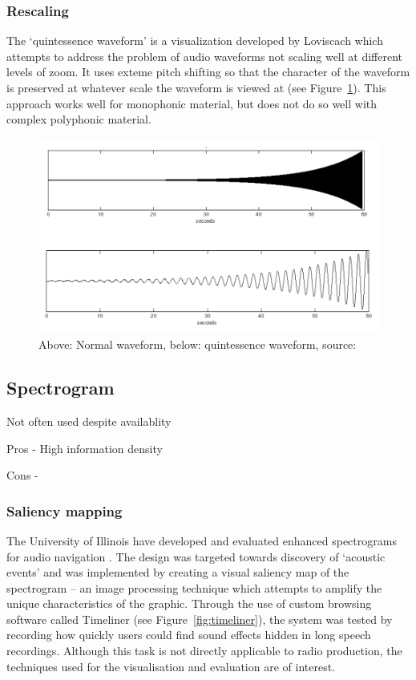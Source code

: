 \subsubsection{Rescaling}
The `quintessence waveform' is a visualization developed by Loviscach
\citep{Loviscach2011} which attempts to address the problem of audio waveforms
not scaling well at different levels of zoom. It uses exteme pitch shifting so
that the character of the waveform is preserved at whatever scale the waveform
is viewed at (see Figure~\ref{fig:quint}). This approach works well for
monophonic material, but does not do so well with complex polyphonic material.

\begin{figure}[ht]
  \centering
  \includegraphics[width=0.95\linewidth]{figs/quint.png}
  \caption{Above: Normal waveform, below: quintessence waveform, source:
  \citep{Loviscach2011}}
  \label{fig:quint}
\end{figure}

\subsection{Spectrogram}

Not often used despite availablity

Pros
- High information density


Cons
- 

\subsubsection{Saliency mapping}
The University of Illinois have developed and evaluated enhanced spectrograms
for audio navigation \citep{Goudeseune2012,Lin2013}. The design was targeted
towards discovery of `acoustic events' and was implemented by creating a visual
saliency map of the spectrogram -- an image processing technique which attempts
to amplify the unique characteristics of the graphic.  Through the use of
custom browsing software called Timeliner (see Figure~\ref{fig:timeliner}), the
system was tested by recording how quickly users could find sound effects
hidden in long speech recordings. Although this task is not directly
applicable to radio production, the techniques used for the visualisation and
evaluation are of interest.

